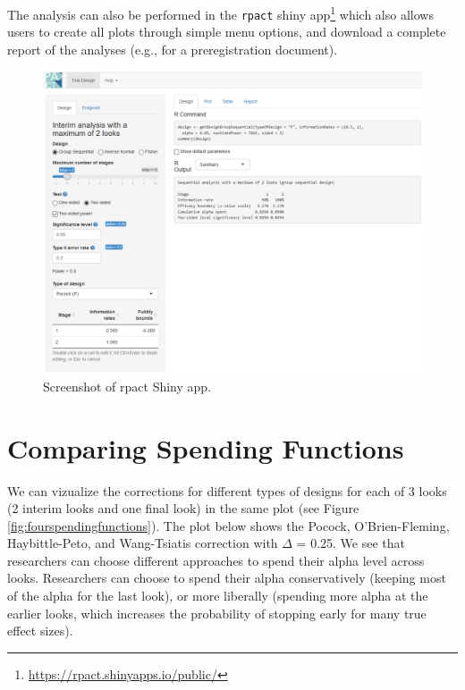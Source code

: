 \documentclass[
  oneside]{krantz}
\renewcommand{\href}[2]{#2\footnote{\url{#1}}}
\begin{document}
The analysis can also be performed in the \texttt{rpact} \href{https://rpact.shinyapps.io/public/}{shiny app} which also allows users to create all plots through simple menu options, and download a complete report of the analyses (e.g., for a preregistration document).



\begin{figure}

{\centering \includegraphics[width=1\linewidth]{images/RPact1} 

}

\caption{Screenshot of rpact Shiny app.}\label{fig:rpactshiny}
\end{figure}

\hypertarget{comparing-spending-functions}{%
\section{Comparing Spending Functions}\label{comparing-spending-functions}}

We can vizualize the corrections for different types of designs for each of 3 looks (2 interim looks and one final look) in the same plot (see Figure \ref{fig:fourspendingfunctions}). The plot below shows the Pocock, O'Brien-Fleming, Haybittle-Peto, and Wang-Tsiatis correction with \(\Delta\) = 0.25. We see that researchers can choose different approaches to spend their alpha level across looks. Researchers can choose to spend their alpha conservatively (keeping most of the alpha for the last look), or more liberally (spending more alpha at the earlier looks, which increases the probability of stopping early for many true effect sizes).
\end{document}
